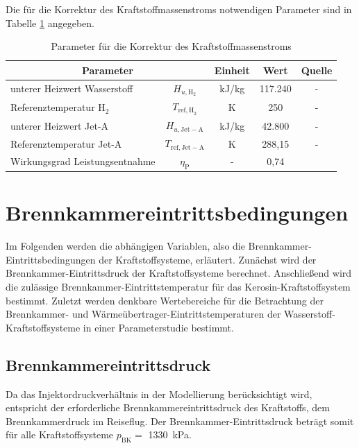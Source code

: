 Die für die Korrektur des Kraftstoffmassenstroms notwendigen Parameter sind in Tabelle \ref{Tab:pot_parametriert} angegeben.

\begin{table}[ht]
    \centering
	\caption{Parameter für die Korrektur des Kraftstoffmassenstroms}
	\begin{tabular} {|l|c|c|c|c|} \hline%
    \multicolumn{2}{|c|}{Parameter} & Einheit & Wert & Quelle\\ \hline\hline%
    unterer Heizwert Wasserstoff & $H_{u, \mathrm{H}_2}$ & kJ/kg & 117.240 & - \\ \hline
    Referenztemperatur H$_2$ & $T_{\mathrm{ref,H}_2}$ & K & 250 & - \\ \hline
    unterer Heizwert Jet-A & $H_{u, \mathrm{Jet-A}}$ & kJ/kg & 42.800 & - \\ \hline
    Referenztemperatur Jet-A & $T_\mathrm{ref,Jet-A}$ & K & 288,15 & - \\ \hline   
    Wirkungsgrad Leistungsentnahme & $\eta_\mathrm{P}$ & - & 0,74 & \cite{Scholz.2013} \\ \hline
	\end{tabular}	
    \label{Tab:pot_parametriert}%
\end{table}
\FloatBarrier 

\section{Brennkammereintrittsbedingungen}

Im Folgenden werden die abhängigen Variablen, also die Brennkammer-Eintrittsbedingungen der Kraftstoffsysteme, erläutert. Zunächst wird der Brennkammer-Eintrittsdruck der Kraftstoffsysteme berechnet. Anschließend wird die zulässige Brennkammer-Eintrittstemperatur für das Kerosin-Kraftstoffsystem bestimmt. Zuletzt werden denkbare Wertebereiche für die Betrachtung der Brennkammer- und Wärmeübertrager-Eintrittstemperaturen der Wasserstoff-Kraftstoffsysteme in einer Parameterstudie bestimmt.

\subsection{Brennkammereintrittsdruck}

Da das Injektordruckverhältnis in der Modellierung berücksichtigt wird, entspricht der erforderliche Brennkammereintrittsdruck des Kraftstoffs, dem Brennkammerdruck im Reiseflug. Der Brennkammer-Eintrittsdruck beträgt somit für alle Kraftstoffsysteme $p_\mathrm{BK}=$ \SI{1330}{\kilo\Pa}.

